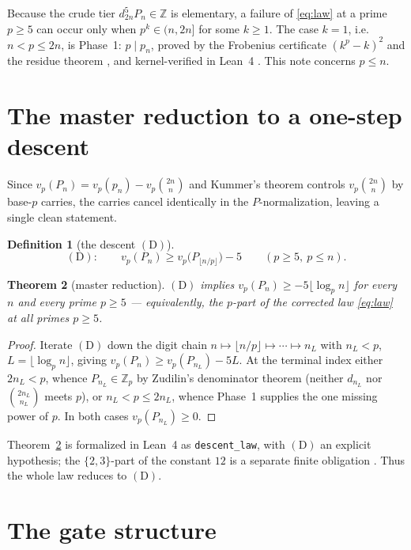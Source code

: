 \documentclass[11pt]{article}
\newtheorem{theorem}{Theorem}
\theoremstyle{definition}
\newtheorem{definition}[theorem]{Definition}
\newcommand{\Z}{\mathbb{Z}}
\newcommand{\Zp}{\Z_p}
\newcommand{\bin}[2]{\binom{#1}{#2}}
\newcommand{\vp}{v_p}
\begin{document}
Because the crude tier $d_{2n}^5 P_n \in \Z$ is elementary, a failure of
\eqref{eq:law} at a prime $p \ge 5$ can occur only when $p^k \in (n, 2n]$ for
some $k \ge 1$. The case $k=1$, i.e.\ $n < p \le 2n$, is Phase~1:
$p \mid p_n$, proved by the Frobenius certificate $(k^p-k)^2$ and the
residue theorem \cite{cbcert}, and kernel-verified in Lean~4 \cite{lean}.
This note concerns $p \le n$.

\section{The master reduction to a one-step descent}

Since $\vp(P_n) = \vp(p_n) - \vp\bin{2n}n$ and Kummer's theorem controls
$\vp\bin{2n}n$ by base-$p$ carries, the carries cancel identically in the
$P$-normalization, leaving a single clean statement.

\begin{definition}[the descent $(\mathrm D)$]
\[
(\mathrm D):\qquad
\vp(P_n) \ge \vp\bigl(P_{\lfloor n/p\rfloor}\bigr) - 5
\qquad (p \ge 5,\ p \le n).
\]
\end{definition}

\begin{theorem}[master reduction]\label{thm:master}
$(\mathrm D)$ implies $\vp(P_n) \ge -5\lfloor\log_p n\rfloor$ for every $n$
and every prime $p \ge 5$ --- equivalently, the $p$-part of the corrected
law \eqref{eq:law} at all primes $p \ge 5$.
\end{theorem}

\begin{proof}
Iterate $(\mathrm D)$ down the digit chain $n \mapsto \lfloor n/p\rfloor
\mapsto \cdots \mapsto n_L$ with $n_L < p$, $L = \lfloor \log_p n\rfloor$,
giving $\vp(P_n) \ge \vp(P_{n_L}) - 5L$. At the terminal index either
$2n_L < p$, whence $P_{n_L} \in \Zp$ by Zudilin's denominator theorem
(neither $d_{n_L}$ nor $\bin{2n_L}{n_L}$ meets $p$), or $n_L < p \le 2n_L$,
whence Phase~1 supplies the one missing power of $p$. In both cases
$\vp(P_{n_L}) \ge 0$.
\end{proof}

Theorem~\ref{thm:master} is formalized in Lean~4 as \texttt{descent\_law},
with $(\mathrm D)$ an explicit hypothesis; the $\{2,3\}$-part of the constant
$12$ is a separate finite obligation \cite{lean}. Thus the whole law reduces
to $(\mathrm D)$.

\section{The gate structure}
\end{document}
